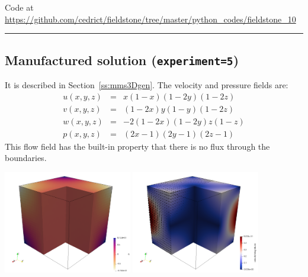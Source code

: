 

\begin{center}
Code at \url{https://github.com/cedrict/fieldstone/tree/master/python_codes/fieldstone_10}
\end{center}

\par\noindent\rule{\textwidth}{0.4pt}

\subsection*{Manufactured solution ({\tt experiment=5})}

It is described in Section~\ref{ss:mms3Dgen}.
The velocity and pressure fields are:
\begin{eqnarray}
u(x,y,z) &=& x(1-x)(1-2y)(1-2z)\\
v(x,y,z) &=& (1-2x) y(1-y) (1-2z) \\
w(x,y,z) &=& -2(1-2x)(1-2y)z(1-z) \\
p(x,y,z) &=& (2x-1)(2y-1)(2z-1)
\end{eqnarray}
This flow field has the built-in property that there is no flux through the 
boundaries. 

\begin{center}
\includegraphics[width=5.6cm]{python_codes/fieldstone_10/results/exp5/press}
\includegraphics[width=5.6cm]{python_codes/fieldstone_10/results/exp5/vel}
\end{center}

